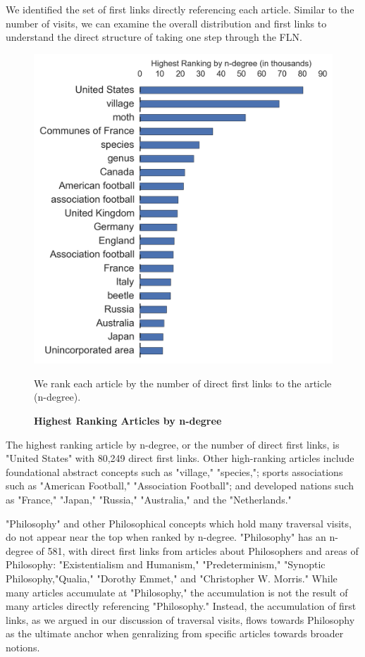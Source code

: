 \documentclass[pre,twocolumn,twoside,superscriptaddress,floatfix, aps, 10pt]{revtex4-1}
\begin{document}
We identified the set of first links directly referencing each article. 
Similar to the number of visits, we can examine the overall distribution and 
first links to understand the direct structure of taking one step through the 
FLN. 


\begin{figure}[tp!]
  \centering	
  \includegraphics[width=\columnwidth]{graphics/articles_ndegree.png}
  \caption{
    \textbf{Highest Ranking Articles by n-degree}
  }
  We rank each article by the number of direct first links to the article (n-degree). 
  \label{fig:ndegree list}

\end{figure}
The highest ranking article by n-degree, or the number of direct first links, is 
"United States" with 80,249 direct first links. Other high-ranking articles
include foundational abstract concepts such as "village," "species,"; 
sports associations such as "American Football," "Association Football"; 
and developed nations such as "France," "Japan," "Russia," "Australia," and 
the "Netherlands." 

"Philosophy" and other Philosophical concepts which hold many traversal visits,
do not appear near the top when ranked by n-degree. 
"Philosophy" has an n-degree of 581, with direct first links from articles about Philosophers and areas of Philosophy: "Existentialism and Humanism," "Predeterminism," "Synoptic Philosophy,"Qualia," "Dorothy Emmet," and "Christopher W. Morris."
While many articles accumulate at "Philosophy," the accumulation is not the 
result of many articles directly referencing "Philosophy." 
Instead, the accumulation of first links, as we argued in our 
discussion of traversal visits, flows towards Philosophy as the 
ultimate anchor when genralizing from specific articles towards broader notions.
\end{document}
